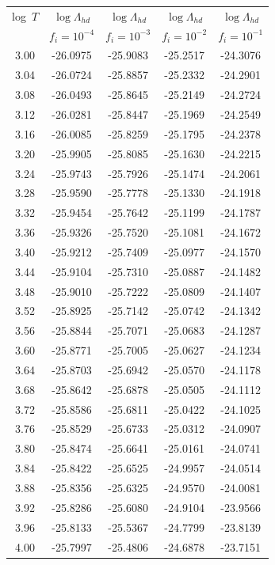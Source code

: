 \documentclass[floatfix,traditabstract,preprint2]{aa}
\begin{document}
\begin{table}[!htbp]
\centering                 
\begin{tabular}{c  c c c c}       
log~$T$& $\log \Lambda_{hd}$ &$\log \Lambda_{hd}$ &$\log \Lambda_{hd}$ & $\log \Lambda_{hd}$ \\
 &$f_i=10^{-4}$ & $f_i=10^{-3}$ &$f_i=10^{-2}$ & $f_i=10^{-1}$\\
\hline
 3.00  & -26.0975  & -25.9083  & -25.2517  & -24.3076\\
 3.04  & -26.0724  & -25.8857  & -25.2332  & -24.2901\\
 3.08  & -26.0493  & -25.8645  & -25.2149  & -24.2724\\
 3.12  & -26.0281  & -25.8447  & -25.1969  & -24.2549\\
 3.16  & -26.0085  & -25.8259  & -25.1795  & -24.2378\\
 3.20  & -25.9905  & -25.8085  & -25.1630  & -24.2215\\
 3.24  & -25.9743  & -25.7926  & -25.1474  & -24.2061\\
 3.28  & -25.9590  & -25.7778  & -25.1330  & -24.1918\\
 3.32  & -25.9454  & -25.7642  & -25.1199  & -24.1787\\
 3.36  & -25.9326  & -25.7520  & -25.1081  & -24.1672\\
 3.40  & -25.9212  & -25.7409  & -25.0977  & -24.1570\\
 3.44  & -25.9104  & -25.7310  & -25.0887  & -24.1482\\
 3.48  & -25.9010  & -25.7222  & -25.0809  & -24.1407\\
 3.52  & -25.8925  & -25.7142  & -25.0742  & -24.1342\\
 3.56  & -25.8844  & -25.7071  & -25.0683  & -24.1287\\
 3.60  & -25.8771  & -25.7005  & -25.0627  & -24.1234\\
 3.64  & -25.8703  & -25.6942  & -25.0570  & -24.1178\\
 3.68  & -25.8642  & -25.6878  & -25.0505  & -24.1112\\
 3.72  & -25.8586  & -25.6811  & -25.0422  & -24.1025\\
 3.76  & -25.8529  & -25.6733  & -25.0312  & -24.0907\\
 3.80  & -25.8474  & -25.6641  & -25.0161  & -24.0741\\
 3.84  & -25.8422  & -25.6525  & -24.9957  & -24.0514\\
 3.88  & -25.8356  & -25.6325  & -24.9570  & -24.0081\\
 3.92  & -25.8286  & -25.6080  & -24.9104  & -23.9566\\
 3.96  & -25.8133  & -25.5367  & -24.7799  & -23.8139\\
 4.00  & -25.7997  & -25.4806  & -24.6878  & -23.7151\\
 \hline                                   
\end{tabular}
\end{table}  
\end{document}
